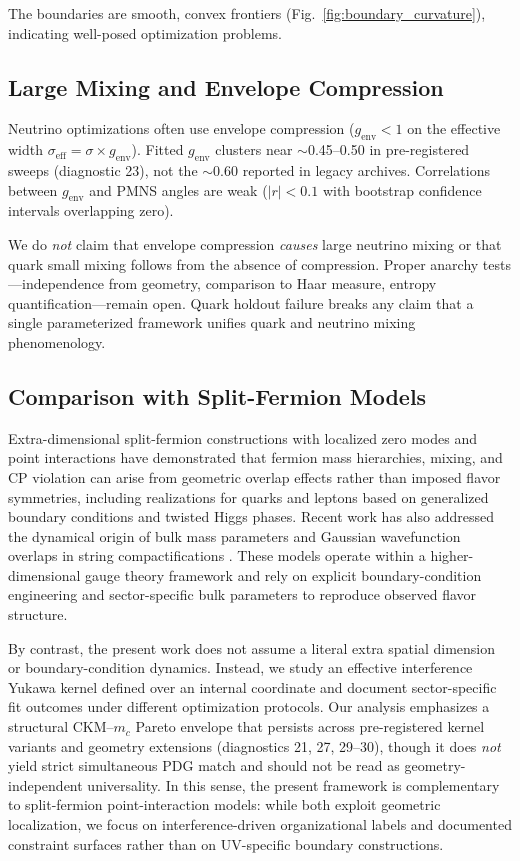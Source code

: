 \documentclass[12pt,a4paper]{article}
\begin{document}
The boundaries are smooth, convex frontiers (Fig.~\ref{fig:boundary_curvature}), indicating well-posed optimization problems.

\subsection{Large Mixing and Envelope Compression}

Neutrino optimizations often use envelope compression ($g_{\text{env}} < 1$ on the effective width $\sigma_{\text{eff}} = \sigma \times g_{\text{env}}$). Fitted $g_{\text{env}}$ clusters near $\sim$0.45--0.50 in pre-registered sweeps (diagnostic 23), not the $\sim$0.60 reported in legacy archives. Correlations between $g_{\text{env}}$ and PMNS angles are weak ($|r| < 0.1$ with bootstrap confidence intervals overlapping zero).

We do \emph{not} claim that envelope compression \emph{causes} large neutrino mixing or that quark small mixing follows from the absence of compression. Proper anarchy tests---independence from geometry, comparison to Haar measure, entropy quantification---remain open. Quark holdout failure breaks any claim that a single parameterized framework unifies quark and neutrino mixing phenomenology.

\subsection{Comparison with Split-Fermion Models}

Extra-dimensional split-fermion constructions with localized zero modes and point interactions have demonstrated that fermion mass hierarchies, mixing, and CP violation can arise from geometric overlap effects rather than imposed flavor symmetries, including realizations for quarks \citep{Fujimoto2013} and leptons \citep{Fujimoto2014} based on generalized boundary conditions and twisted Higgs phases. Recent work has also addressed the dynamical origin of bulk mass parameters \citep{Angelescu2019} and Gaussian wavefunction overlaps in string compactifications \citep{Abe2016}. These models operate within a higher-dimensional gauge theory framework and rely on explicit boundary-condition engineering and sector-specific bulk parameters to reproduce observed flavor structure.

By contrast, the present work does not assume a literal extra spatial dimension or boundary-condition dynamics. Instead, we study an effective interference Yukawa kernel defined over an internal coordinate and document sector-specific fit outcomes under different optimization protocols. Our analysis emphasizes a structural CKM--$m_c$ Pareto envelope that persists across pre-registered kernel variants and geometry extensions (diagnostics 21, 27, 29--30), though it does \emph{not} yield strict simultaneous PDG match and should not be read as geometry-independent universality. In this sense, the present framework is complementary to split-fermion point-interaction models: while both exploit geometric localization, we focus on interference-driven organizational labels and documented constraint surfaces rather than on UV-specific boundary constructions.
\end{document}
